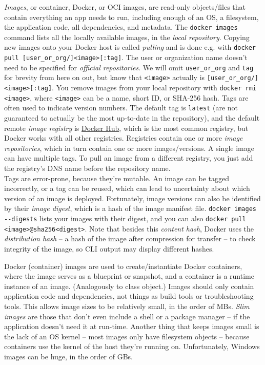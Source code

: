 \documentclass[8pt, table, xcdraw]{article}%
\begin{document}
\emph{Images}, or container, Docker, or OCI images, are read-only objects/files that contain everything an app needs to run, including enough of an OS, a filesystem, the application code, all dependencies, and metadata. The \lstinline{docker images} command lists all the locally available images, in the \emph{local repository}. Copying new images onto your Docker host is called \emph{pulling} and is done e.g. with \lstinline{docker pull [user_or_org/]<image>[:tag]}. The user or organization name doesn't need to be specified for \emph{official repositories}. We will omit \lstinline{user_or_org} and \lstinline{tag} for brevity from here on out, but know that \lstinline{<image>} actually is \lstinline{[user_or_org/]<image>[:tag]}. You remove images from your local repository with \lstinline{docker rmi <image>}, where \lstinline{<image>} can be a name, short ID, or SHA-256 hash. Tags are often used to indicate version numbers. The default tag is \lstinline{latest} (are not guaranteed to actually be the most up-to-date in the repository), and the default remote \emph{image registry} is \href{https://hub.docker.com/}{Docker Hub}, which is the most common registry, but Docker works with all other registries. Registries contain one or more \emph{image repositories}, which in turn contain one or more images/versions. A single image can have multiple tags. To pull an image from a different registry, you just add the registry’s DNS name before the repository name.\\
Tags are error-prone, because they're mutable. An image can be tagged incorrectly, or a tag can be reused, which can lead to uncertainty about which version of an image is deployed. Fortunately, image versions can also be identified by their \emph{image digest}, which is a hash of the image manifest file. \lstinline{docker images --digests} lists your images with their digest, and you can also \lstinline{docker pull <image>@sha256<digest>}. Note that besides this \emph{content hash}, Docker uses the \emph{distribution hash} -- a hash of the image after compression for transfer -- to check integrity of the image, so CLI output may display different hashes.

Docker (container) images are used to create/instantiate Docker containers, where the image serves as a blueprint or snapshot, and a container is a runtime instance of an image. (Analogously to class \textrightarrow object.) Images should only contain application code and dependencies, not things as build tools or troubleshooting tools. This allows image sizes to be relatively small, in the order of MBs. \emph{Slim images} are those that don't even include a shell or a package manager -- if the application doesn’t need it at run-time. Another thing that keeps images small is the lack of an OS kernel -- most images only have filesystem objects -- because containers use the kernel of the host they’re running on. Unfortunately, Windows images can be huge, in the order of GBs.
\end{document}
